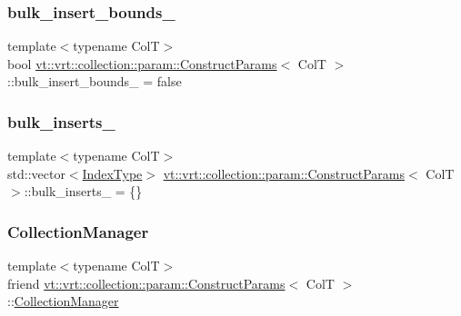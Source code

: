 \subsubsection{\texorpdfstring{bulk\+\_\+insert\+\_\+bounds\+\_\+}{bulk\_insert\_bounds\_}}
{\footnotesize\ttfamily template$<$typename ColT$>$ \\
bool \hyperlink{structvt_1_1vrt_1_1collection_1_1param_1_1_construct_params}{vt\+::vrt\+::collection\+::param\+::\+Construct\+Params}$<$ ColT $>$\+::bulk\+\_\+insert\+\_\+bounds\+\_\+ = false\hspace{0.3cm}{\ttfamily [private]}}

\mbox{\label{structvt_1_1vrt_1_1collection_1_1param_1_1_construct_params_a4de8932b1c4f4e4e0998630cbe6ed08f}} 
\subsubsection{\texorpdfstring{bulk\+\_\+inserts\+\_\+}{bulk\_inserts\_}}
{\footnotesize\ttfamily template$<$typename ColT$>$ \\
std\+::vector$<$\hyperlink{structvt_1_1vrt_1_1collection_1_1param_1_1_construct_params_a7bc8d5d57e377e0f2e60031582eeb7e6}{Index\+Type}$>$ \hyperlink{structvt_1_1vrt_1_1collection_1_1param_1_1_construct_params}{vt\+::vrt\+::collection\+::param\+::\+Construct\+Params}$<$ ColT $>$\+::bulk\+\_\+inserts\+\_\+ = \{\}\hspace{0.3cm}{\ttfamily [private]}}

\mbox{\label{structvt_1_1vrt_1_1collection_1_1param_1_1_construct_params_a8a00b8a2017cec4453e2be8dd90742c7}} 
\subsubsection{\texorpdfstring{Collection\+Manager}{CollectionManager}}
{\footnotesize\ttfamily template$<$typename ColT$>$ \\
friend \hyperlink{structvt_1_1vrt_1_1collection_1_1param_1_1_construct_params}{vt\+::vrt\+::collection\+::param\+::\+Construct\+Params}$<$ ColT $>$\+::\hyperlink{structvt_1_1vrt_1_1collection_1_1_collection_manager}{Collection\+Manager}}

